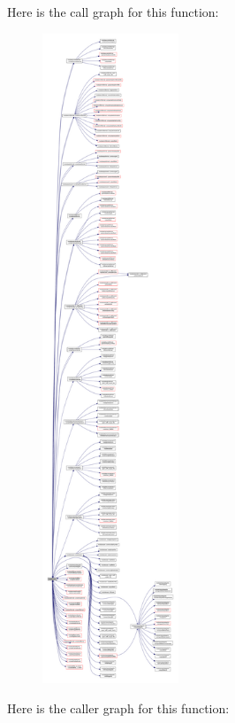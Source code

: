 Here is the call graph for this function\+:\nopagebreak
\begin{figure}[H]
\begin{center}
\leavevmode
\includegraphics[height=550pt]{_convert_to_h_d_f5_8_f90_a2233a80cf5c89674ce4f80d91531c0ea_cgraph}
\end{center}
\end{figure}
Here is the caller graph for this function\+:\nopagebreak
